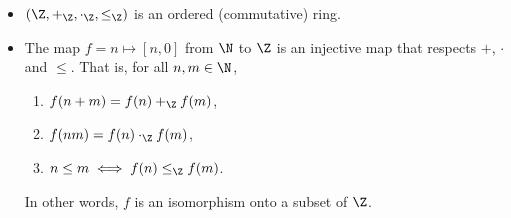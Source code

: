 \begin{theorem} \leavevmode
    \begin{itemize}
        \item $(\Z, +_\Z, \cdot_\Z, \le_\Z)$ is an ordered (commutative) ring.
        \item The map $f = n \mapsto [n, 0]$ from $\N$ to $\Z$ is an
        injective map that respects $+$, $\cdot$ and $\le$.
        That is, for all $n, m \in \N$,
        \begin{enumerate}
            \item $f(n + m) = f(n) +_\Z f(m)$,
            \item $f(nm) = f(n) \cdot_\Z f(m)$,
            \item $n \le m \iff f(n) \le_\Z f(m)$.
        \end{enumerate}
        In other words, $f$ is an isomorphism onto a subset of $\Z$.
    \end{itemize}
\end{theorem}
